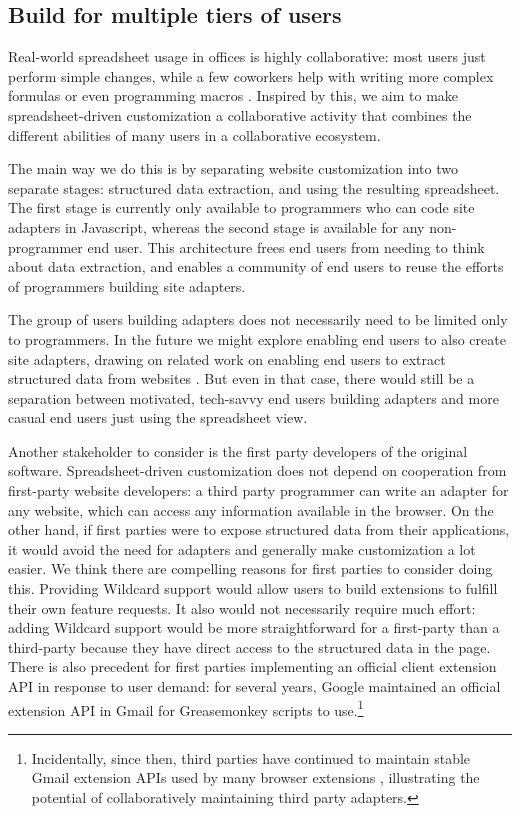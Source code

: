 \documentclass[english,submission]{programming}
\begin{document}
\hypertarget{build-for-multiple-tiers-of-users}{%
\subsection{Build for multiple tiers of
users}\label{build-for-multiple-tiers-of-users}}

Real-world spreadsheet usage in offices is highly collaborative: most
users just perform simple changes, while a few coworkers help with
writing more complex formulas or even programming macros
\autocite{nardi1990}. Inspired by this, we aim to make
spreadsheet-driven customization a collaborative activity that combines
the different abilities of many users in a collaborative ecosystem.

The main way we do this is by separating website customization into two
separate stages: structured data extraction, and using the resulting
spreadsheet. The first stage is currently only available to programmers
who can code site adapters in Javascript, whereas the second stage is
available for any non-programmer end user. This architecture frees end
users from needing to think about data extraction, and enables a
community of end users to reuse the efforts of programmers building site
adapters.

The group of users building adapters does not necessarily need to be
limited only to programmers. In the future we might explore enabling end
users to also create site adapters, drawing on related work on enabling
end users to extract structured data from websites
\autocite{chasins2018,huynh2006}. But even in that case, there would
still be a separation between motivated, tech-savvy end users building
adapters and more casual end users just using the spreadsheet view.

Another stakeholder to consider is the first party developers of the
original software. Spreadsheet-driven customization does not depend on
cooperation from first-party website developers: a third party
programmer can write an adapter for any website, which can access any
information available in the browser. On the other hand, if first
parties were to expose structured data from their applications, it would
avoid the need for adapters and generally make customization a lot
easier. We think there are compelling reasons for first parties to
consider doing this. Providing Wildcard support would allow users to
build extensions to fulfill their own feature requests. It also would
not necessarily require much effort: adding Wildcard support would be
more straightforward for a first-party than a third-party because they
have direct access to the structured data in the page. There is also
precedent for first parties implementing an official client extension
API in response to user demand: for several years, Google maintained an
official extension API in Gmail for Greasemonkey scripts to
use.\footnote{Incidentally, since then, third parties have continued to
  maintain stable Gmail extension APIs used by many browser extensions
  \autocite{streak,talwar2019}, illustrating the potential of
  collaboratively maintaining third party adapters.}
\end{document}
